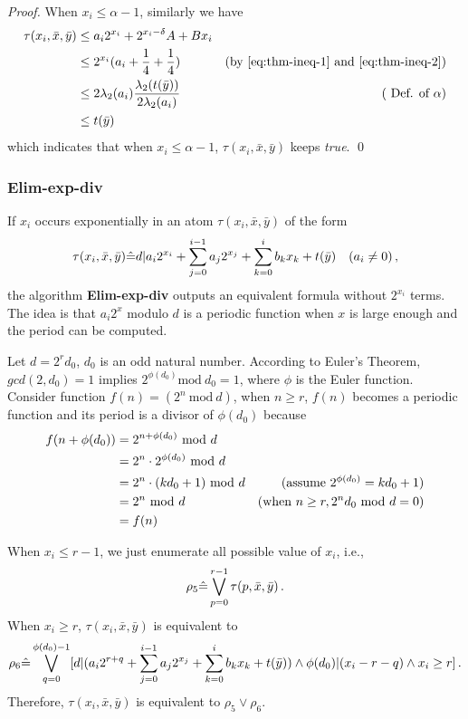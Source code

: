 {\begin{proof}
When $x_i \le \alpha-1$, similarly we have
\begin{align}
    \tau(x_i,\bar{x},\bar{y})\notag 
    & \le  a_i 2^{x_i} + 2^{x_i -\delta}A  + Bx_i &  \notag \\
    & \le  2^{x_i}(a_i +\frac{1}{4} +\frac{1}{4}) &(\mbox{by \eqref{eq:thm-ineq-1} and  \eqref{eq:thm-ineq-2}}) \notag \\
   & \le  2\lambda_2(a_i)\frac{\lambda_2(t(\bar{y}))}{2\lambda_2(a_i)} &  (\mbox{ Def. of } \alpha) \notag \\
   &  \le  t(\bar{y}) & \notag 
\end{align}
which indicates that when  $x_i \le \alpha-1$, $\tau(x_i,\bar{x},\bar{y})$ keeps \textit{true}. \qed 
\end{proof}

\subsubsection{Elim-exp-div}

If $x_i$ occurs exponentially in an atom $\tau(x_i,\bar{x},\bar{y})$ of the form
$$\tau(x_i,\bar{x},\bar{y}) \hat{=}  d| a_i 2^{x_i}+\sum_{j=0}^{i-1} a_j 2^{x_j} + \sum_{k=0}^{i} b_k x_k+t(\bar{y}) \quad (a_i \neq 0)\,,$$
the algorithm \textbf{Elim-exp-div} outputs an equivalent formula without $2^{x_i}$ terms.
The idea is that $a_i 2^x$ modulo $d$ is a periodic function when $x$ is large enough and the period can be computed.

Let $d = 2^rd_0$, $d_0$ is an odd natural number. 
According to Euler's Theorem, 
$gcd(2,d_0)=1$ implies
$2^{\phi(d_0)} \text{mod}\ d_0 = 1$,
where $\phi$ is the Euler function.
Consider function $f(n)=(2^n\ \text{mod} \ d)$,
when $n\ge r$, 
$f(n)$ becomes a periodic function and its period is a divisor of $\phi(d_0)$ because
\begin{align}
    f(n+\phi(d_0)) 
    &=2^{n+\phi(d_0)}\ \text{mod}\ d &\notag\\
    &=2^n\cdot 2^{\phi(d_0)}\ \text{mod}\ d &\notag\\
    &=2^n\cdot (k d_0 + 1) \ \text{mod}\ d &
    (\mbox{assume } 2^{\phi(d_0)}=k d_0 +1) \notag \\
    &= 2^n \ \text{mod}\ d &
    (\mbox{when } n\ge r, 2^n d_0\ \text{mod}\ d = 0 )\notag\\
    &= f(n) \notag
\end{align}

When $x_i\le r-1$, we just enumerate all possible value of $x_i$, i.e., 
$$\rho_5 \hat{=} \bigvee_{p=0}^{r-1} \tau(p,\bar{x},\bar{y})\,.$$
When $x_i\ge r$, $\tau(x_i,\bar{x},\bar{y})$ is equivalent to
$$
\rho_6 \hat{=} \bigvee_{q=0}^{\phi(d_0)-1} [d|(a_i 2^{r+q}+\sum_{j=0}^{i-1} a_j 2^{x_j}
+  \sum_{k=0}^{i} b_k x_k+t(\bar{y})) \wedge \phi(d_0)|(x_i-r-q) \wedge x_i \ge r] \,.
$$
            Therefore,  $\tau(x_i,\bar{x},\bar{y})$ is equivalent to  $\rho_5 \vee \rho_6$.
}

